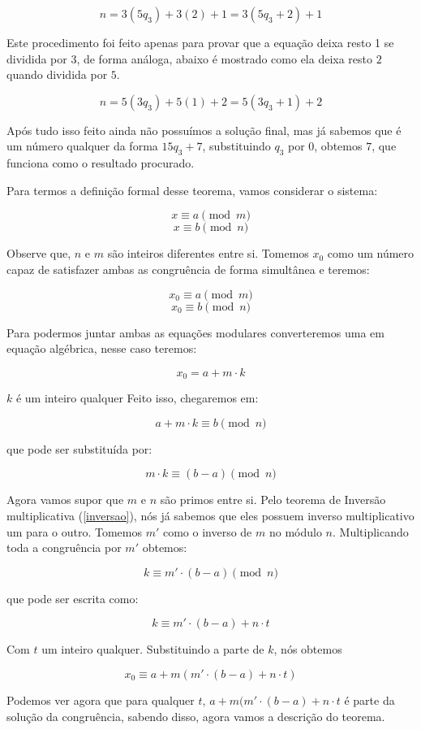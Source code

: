 $$n = 3(5q_3) +3(2) +1 = 3(5q_3 +2)+1$$

Este procedimento foi feito apenas para provar que a equa\c{c}\~ao deixa resto 1 se dividida por 3, de forma an\'aloga, abaixo \'e mostrado como ela deixa resto $2$ quando dividida por $5$.

$$n = 5(3q_3) +5(1) +2 = 5(3q_3 +1)+2$$

Ap\'os tudo isso feito ainda n\~ao possu\'imos a solu\c{c}\~ao final, mas j\'a sabemos que \'e um n\'umero qualquer da forma $15q_3 + 7$, substituindo $q_3$ por $0$, obtemos $7$, que funciona como o resultado procurado.


Para termos a defini\c{c}\~ao formal desse teorema, vamos considerar o sistema:

$$x \equiv a \pmod{m}$$
$$x \equiv b \pmod{n}$$

Observe que, $n$ e $m$ s\~ao inteiros diferentes entre si. Tomemos $x_0$ como um n\'umero capaz de satisfazer ambas as congru\^encia de forma simult\^anea e teremos:

$$x_0 \equiv a \pmod{m}$$
$$x_0 \equiv b \pmod{n}$$

Para podermos juntar ambas as equa\c{c}\~oes modulares converteremos uma em equa\c{c}\~ao alg\'ebrica, nesse caso teremos: 

$$x_0 = a + m\cdot k$$

$k$ \'e um inteiro qualquer Feito isso, chegaremos em:

$$a + m\cdot k \equiv b \pmod{n}$$

que pode ser substitu\'ida por:

$$ m\cdot k \equiv (b-a) \pmod{n}$$

Agora vamos supor que $m$ e $n$ s\~ao primos entre si. Pelo teorema de Invers\~ao multiplicativa (\ref{inversao}), n\'os j\'a sabemos que eles possuem inverso multiplicativo um para o outro. Tomemos $m'$ como o inverso de $m$ no m\'odulo $n$. Multiplicando toda a congru\^encia por $m'$ obtemos:

$$ k \equiv m'\cdot(b-a) \pmod{n}$$

que pode ser escrita como:

$$ k \equiv m'\cdot(b-a)+n \cdot t$$


Com $t$ um inteiro qualquer. Substituindo a parte de $k$, n\'os obtemos

$$ x_0 \equiv a + m (m'\cdot(b-a)+n \cdot t) $$


Podemos ver agora que para qualquer $t$, $a + m (m'\cdot(b-a)+n \cdot t$ \'e parte da solu\c{c}\~ao da congru\^encia, sabendo disso, agora vamos a descri\c{c}\~ao do teorema.


